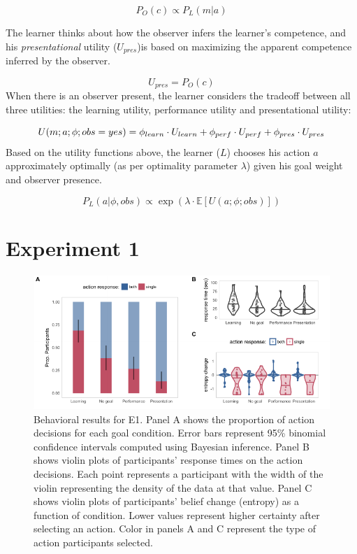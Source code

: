 \documentclass[10pt, letterpaper]{article}
\newenvironment{CodeChunk}{}{}
\begin{document}
\[ P_O(c) \propto P_L(m | a)\]

The learner thinks about how the observer infers the learner's
competence, and his \emph{presentational} utility (\(U_{pres}\))is based
on maximizing the apparent competence inferred by the observer.

\[ U_{pres} = P_O(c) \] When there is an observer present, the learner
considers the tradeoff between all three utilities: the learning
utility, performance utility and presentational utility:

\[ U(m;a;\phi; obs = yes) = \phi_{learn} \cdot U_{learn} + \\ \phi_{perf} \cdot U_{perf} + \phi_{pres} \cdot U_{pres}\]
Based on the utility functions above, the learner (\(L\)) chooses his
action \(a\) approximately optimally (as per optimality parameter
\(\lambda\)) given his goal weight and observer presence.

\[ P_L(a | \phi, obs) \propto \exp(\lambda \cdot \mathbb{E}[U(a;\phi; obs)])\]

\section{Experiment 1}\label{experiment-1}

\begin{CodeChunk}
\begin{figure}[tb]

{\centering \includegraphics[width=0.95\linewidth]{figs/e1_behav_results_plot-1} 

}

\caption[Behavioral results for E1]{Behavioral results for E1. Panel A shows the proportion of action decisions for each goal condition. Error bars represent 95\% binomial confidence intervals computed using Bayesian inference. Panel B shows violin plots of participants' response times on the action decisions. Each point represents a participant with the width of the violin representing the density of the data at that value. Panel C shows violin plots of participants' belief change (entropy) as a function of condition. Lower values represent higher certainty after selecting an action. Color in panels A and C represent the type of action participants selected.}\label{fig:e1_behav_results_plot}
\end{figure}
\end{CodeChunk}
\end{document}
